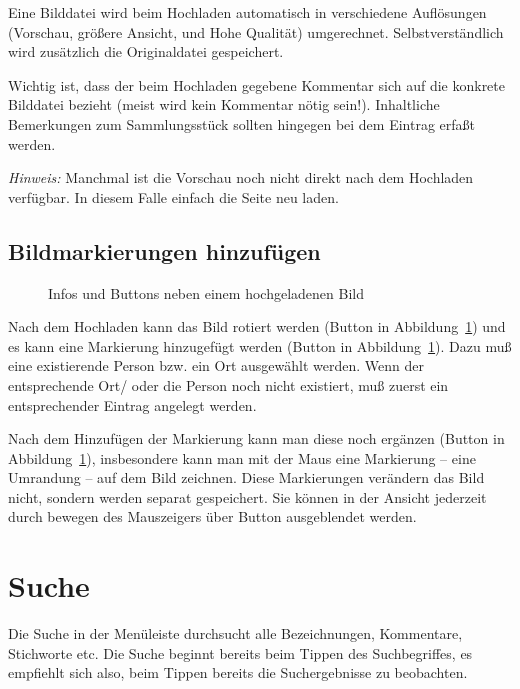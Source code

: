 \documentclass[12pt]{scrreprt}
\begin{document}
Eine Bilddatei wird beim Hochladen automatisch in verschiedene
Auflösungen (Vorschau, größere Ansicht, und Hohe Qualität)
umgerechnet. Selbstverständlich wird zusätzlich die Originaldatei
gespeichert.

Wichtig ist, dass der beim Hochladen gegebene Kommentar sich auf die
konkrete Bilddatei bezieht (meist wird kein Kommentar nötig
sein!). Inhaltliche Bemerkungen zum Sammlungsstück sollten hingegen
bei dem Eintrag erfaßt werden.


\textit{Hinweis:} Manchmal ist die Vorschau noch nicht direkt nach dem
Hochladen verfügbar. In diesem Falle einfach die Seite neu laden.

\subsection{Bildmarkierungen hinzufügen}
\begin{figure}
  \begin{center}
  \end{center}
  \caption{\label{bild-edit} Infos und Buttons neben einem hochgeladenen Bild}
\end{figure}

Nach dem Hochladen kann das Bild rotiert werden (Button  in Abbildung~\ref{bild-edit}) und
es kann eine Markierung hinzugefügt werden (Button  in Abbildung~\ref{bild-edit}).
Dazu muß eine existierende Person bzw. ein Ort ausgewählt werden. Wenn der entsprechende
Ort/ oder die Person noch nicht existiert, muß zuerst ein entsprechender Eintrag angelegt werden.

Nach dem Hinzufügen der Markierung kann man diese noch ergänzen
(Button  in Abbildung~\ref{bild-edit}), insbesondere kann man mit
der Maus eine Markierung -- eine Umrandung -- auf dem Bild
zeichnen. Diese Markierungen verändern das Bild nicht, sondern werden
separat gespeichert. Sie können in der Ansicht jederzeit durch bewegen
des Mauszeigers über Button  ausgeblendet werden.

\section{Suche}

Die Suche in der Menüleiste durchsucht alle Bezeichnungen, Kommentare, Stichworte etc.
Die Suche beginnt bereits beim Tippen des Suchbegriffes, es empfiehlt sich also,
beim Tippen bereits die Suchergebnisse zu beobachten.
\end{document}
